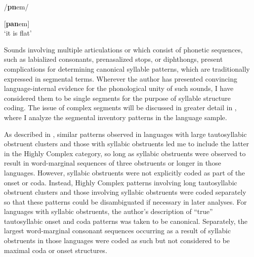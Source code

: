 /\textbf{pn}em/

[\textbf{pan}em]\\
\glt ‘it is flat’
\citep[35--36]{Dol2007}
\z

  Sounds involving multiple articulations or which consist of phonetic sequences, such as labialized consonants, prenasalized stops, or diphthongs, present complications for determining canonical syllable patterns, which are traditionally expressed in segmental terms. Wherever the author has presented convincing language-internal evidence for the phonological unity of such sounds, I have considered them to be single segments for the purpose of syllable structure coding. The issue of complex segments will be discussed in greater detail in , where I analyze the segmental inventory patterns in the language sample.

  As described in , similar patterns observed in languages with large tautosyllabic obstruent clusters and those with syllabic obstruents led me to include the latter in the Highly Complex category, so long as syllabic obstruents were observed to result in word-marginal sequences of three obstruents or longer in those languages. However, syllabic obstruents were not explicitly coded as part of the onset or coda. Instead, Highly Complex patterns involving long tautosyllabic obstruent clusters and those involving syllabic obstruents were coded separately so that these patterns could be disambiguated if necessary in later analyses. For languages with syllabic obstruents, the author’s description of ``true'' tautosyllabic onset and coda patterns was taken to be canonical. Separately, the largest word-marginal consonant sequences occurring as a result of syllabic obstruents in those languages were coded as such but not considered to be maximal coda or onset structures.

